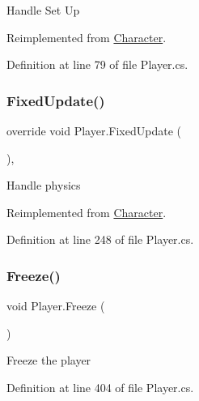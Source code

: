 Handle Set Up 



Reimplemented from \mbox{\hyperlink{class_character_a7cca5d1f141f2f46a1d087fd3e28a953}{Character}}.



Definition at line 79 of file Player.\+cs.

\mbox{\label{class_player_a9f719f4557355ff498cc7ff6d3723a84}} 
\subsubsection{\texorpdfstring{Fixed\+Update()}{FixedUpdate()}}
{\footnotesize\ttfamily override void Player.\+Fixed\+Update (\begin{DoxyParamCaption}{ }\end{DoxyParamCaption})\hspace{0.3cm}{\ttfamily [protected]}, {\ttfamily [virtual]}}



Handle physics 



Reimplemented from \mbox{\hyperlink{class_character_ad90105ab5e234884e5bca7ce5bd2c50e}{Character}}.



Definition at line 248 of file Player.\+cs.

\mbox{\label{class_player_a8e3a84181da3b91573fb395fb8821a90}} 
\subsubsection{\texorpdfstring{Freeze()}{Freeze()}}
{\footnotesize\ttfamily void Player.\+Freeze (\begin{DoxyParamCaption}{ }\end{DoxyParamCaption})}



Freeze the player 



Definition at line 404 of file Player.\+cs.

\mbox{\label{class_player_ac4bbf69d383242cbf6807fdd28ee0f0d}} 
